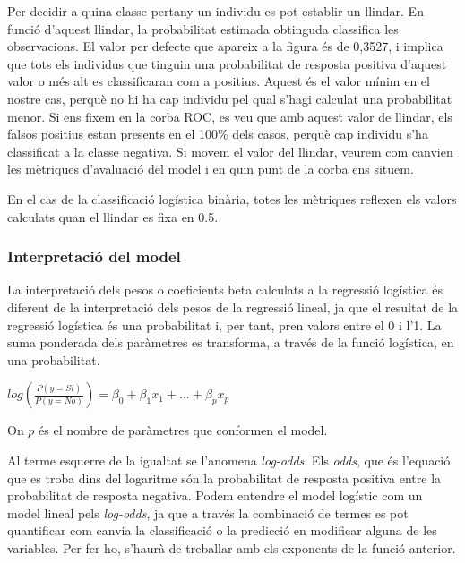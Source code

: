 \documentclass[11pt,longbibliography]{article}
\theoremstyle{definition}
\theoremstyle{remark}
\begin{document}
Per decidir a quina classe pertany un individu es pot establir un llindar. En funció d'aquest llindar, la probabilitat estimada obtinguda classifica les observacions. El valor per defecte que apareix a la figura és de 0,3527, i implica que tots els individus que tinguin una probabilitat de resposta positiva d'aquest valor o més alt es classificaran com a positius. Aquest és el valor mínim en el nostre cas, perquè no hi ha cap individu pel qual s'hagi calculat una probabilitat menor. Si ens fixem en la corba ROC, es veu que amb aquest valor de llindar, els falsos positius estan presents en el 100\% dels casos, perquè cap individu s'ha classificat a la classe negativa. Si movem el valor del llindar, veurem com canvien les mètriques d'avaluació del model i en quin punt de la corba ens situem.

En el cas de la classificació logística binària, totes les mètriques reflexen els valors calculats quan el llindar es fixa en 0.5.

\subsubsection{Interpretació del model}


La interpretació dels pesos o coeficients beta calculats a la regressió logística és diferent de la interpretació dels pesos de la regressió lineal, ja que el resultat de la regressió logística és una probabilitat i, per tant, pren valors entre el 0 i l'1. La suma ponderada dels paràmetres es transforma, a través de la funció logística, en una probabilitat.

\begin{center}

$log \left( \frac{P(y = Si)}{P(y = No)} \right) = \beta_0 + \beta_1 x_1 + ... + \beta_p x_p$

\end{center}

On $p$ és el nombre de paràmetres que conformen el model.



Al terme esquerre de la igualtat se l'anomena \emph{log-odds}. Els \emph{odds}, que és l'equació que es troba dins del logaritme són la probabilitat de resposta positiva entre la probabilitat de resposta negativa. Podem entendre el model logístic com un model lineal pels \emph{log-odds}, ja que a través la combinació de termes es pot quantificar com canvia la classificació o la predicció en modificar alguna de les variables. Per fer-ho, s'haurà de treballar amb els exponents de la funció anterior.
\end{document}
